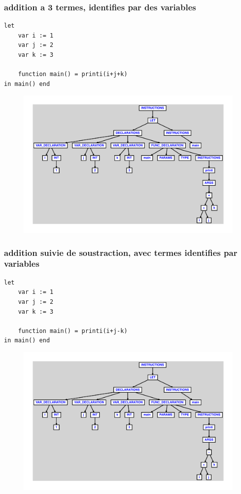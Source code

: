 \documentclass{article}
\begin{document}
\subsubsection{addition a 3 termes, identifies par des variables}
\begin{lstlisting}
let
	var i := 1
	var j := 2
	var k := 3

	function main() = printi(i+j+k)
in main() end
\end{lstlisting}
\newpage
\begin{figure}[H]
\centering
\includegraphics[max width=\textwidth]{ast/ast_55.pdf}
\end{figure}
\newpage
\subsubsection{addition suivie de soustraction, avec termes identifies par variables}
\begin{lstlisting}
let
	var i := 1
	var j := 2
	var k := 3

	function main() = printi(i+j-k)
in main() end
\end{lstlisting}
\newpage
\begin{figure}[H]
\centering
\includegraphics[max width=\textwidth]{ast/ast_56.pdf}
\end{figure}
\newpage
\end{document}

